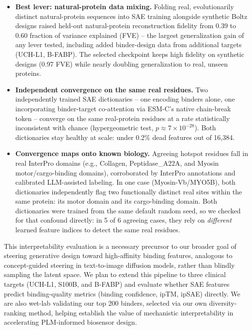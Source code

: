 \documentclass[11pt]{article}
\newcommand{\onepagersection}[1]{\vspace{0.4\baselineskip}{\bfseries #1}\vspace{0.1\baselineskip}\par}
\begin{document}
\onepagersection{Results}
\begin{itemize}
\setlength{\itemsep}{1pt}
\setlength{\topsep}{2pt}
  \item \textbf{Best lever: natural-protein data mixing.} Folding real, evolutionarily distinct natural-protein sequences into SAE training alongside synthetic Boltz designs raised held-out natural-protein reconstruction fidelity from 0.39 to 0.60 fraction of variance explained (FVE) -- the largest generalization gain of any lever tested, including added binder-design data from additional targets (UCH-L1, B-FABP). The selected checkpoint keeps high fidelity on synthetic designs (0.97 FVE) while nearly doubling generalization to real, unseen proteins.
  \item \textbf{Independent convergence on the same real residues.} Two independently trained SAE dictionaries -- one encoding binders alone, one incorporating binder-target co-attention via ESM-C's native chain-break token -- converge on the same real-protein residues at a rate statistically inconsistent with chance (hypergeometric test, $p \approx 7\times10^{-28}$). Both dictionaries stay healthy at scale: under 0.2\% dead features out of 16{,}384.
  \item \textbf{Convergence maps onto known biology.} Agreeing hotspot residues fall in real InterPro domains (e.g., Collagen, Peptidase\_A22A, and Myosin motor/cargo-binding domains), corroborated by InterPro annotations and calibrated LLM-assisted labeling. In one case (Myosin-Vb/MYO5B), both dictionaries independently flag two functionally distinct real sites within the same protein: its motor domain and its cargo-binding domain. Both dictionaries were trained from the same default random seed, so we checked for that confound directly: in 5 of 6 agreeing cases, they rely on \emph{different} learned feature indices to detect the same real residues.
\end{itemize}

\onepagersection{Ongoing \& Future Work}
This interpretability evaluation is a necessary precursor to our broader goal of steering generative design toward high-affinity binding features, analogous to concept-guided steering in text-to-image diffusion models, rather than blindly sampling the latent space. We plan to extend this pipeline to three clinical targets (UCH-L1, S100B, and B-FABP) and evaluate whether SAE features predict binding-quality metrics (binding confidence, ipTM, ipSAE) directly. We are also wet-lab validating our top 200 binders, selected via our own diversity-ranking method, helping establish the value of mechanistic interpretability in accelerating PLM-informed biosensor design.
\end{document}
